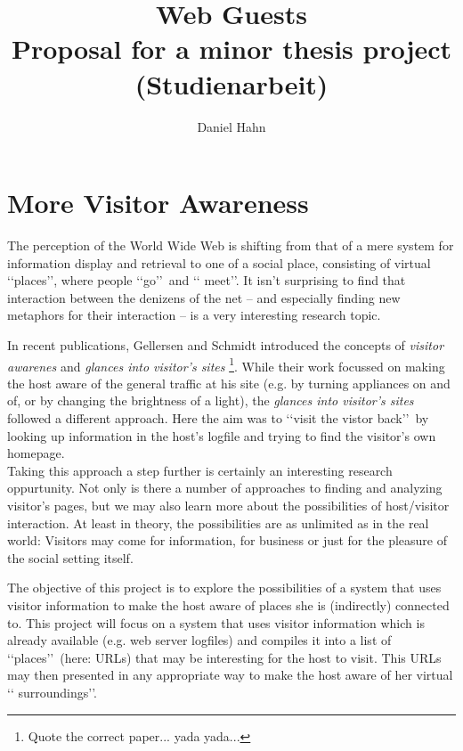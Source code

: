\documentclass[a4paper]{danarticle}
\begin{document}
  \author{Daniel Hahn}
  \title{Web Guests\\ Proposal for a minor thesis project\\ (Studienarbeit)}
  \maketitle
  \section*{More Visitor Awareness}
    The perception of the World Wide Web is shifting from that of a mere system
    for information display and retrieval to one of a social place, consisting
    of virtual \lq\lq places\rq\rq , where people \lq\lq go\rq\rq\ and \lq\lq
    meet\rq\rq . It isn't surprising to find that interaction between the denizens
    of the net -- and especially finding new metaphors for their interaction --
    is a very interesting research topic.
    
    In recent publications, Gellersen and Schmidt introduced the concepts of
    \textit{visitor awarenes} and \textit{glances into visitor's sites}
    \footnote{Quote the correct paper... yada yada...}. While their work
    focussed on making the host aware of the general traffic at his site (e.g.
    by turning appliances on and of, or by changing the brightness of a light),
    the \textit{glances into visitor's sites} followed a different approach.
    Here the aim was to \lq\lq visit the vistor back\rq\rq\ by looking up
    information in the host's logfile and trying to find the visitor's own
    homepage.
    \\
    Taking this approach a step further is certainly an interesting research
    oppurtunity. Not only is there a number of approaches to finding and
    analyzing visitor's pages, but we may also learn more about the
    possibilities of host/visitor interaction. At least in theory, the
    possibilities are as unlimited as in the real world: Visitors may come for
    information, for business or just for the pleasure of the social setting
    itself. 
    
    The objective of this project is to explore the possibilities of a system 
    that uses visitor information to make the host aware of places she is
    (indirectly) connected to. This project will focus on a system that 
    uses visitor
    information which is already available (e.g. web server logfiles) and
    compiles it into a list of \lq\lq places\rq\rq\ (here: URLs) that may be
    interesting for the host to visit. This URLs may then presented in any
    appropriate way to make the host aware of her virtual \lq\lq
    surroundings\rq\rq . 
    \\
    
\end{document}
